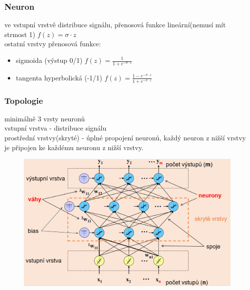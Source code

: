 \subsubsection{Neuron}
ve vstupní vrstvě distribuce signálu, přenosová funkce lineární(nemusí mít strmost 1) \(f(z) = \sigma \cdot z\) \\
ostatní vrstvy přenosová funkce:
\begin{itemize}
    \item sigmoida (výstup 0/1) \(f(z) = \frac{1}{1+e^{-\sigma \cdot z}}\)
    \item tangenta hyperbolická (-1/1) \(f(z) = \frac{1-e^{-\sigma \cdot z}}{1+e^{-\sigma \cdot z}}\)
\end{itemize}

\subsubsection{Topologie}
minimálně 3 vrsty neuronů\\
vstupní vrstva - distribuce signálu\\
prostřední vrstvy(skryté) - úplné propojení neuronů, každý neuron z nižší vrstvy je připojen ke každému neuronu z nižší vrstvy.\\
\begin{figure}[h!]
    \centering
    \includegraphics[scale = 0.2]{images/backPropag_topologie.png}
\end{figure}

